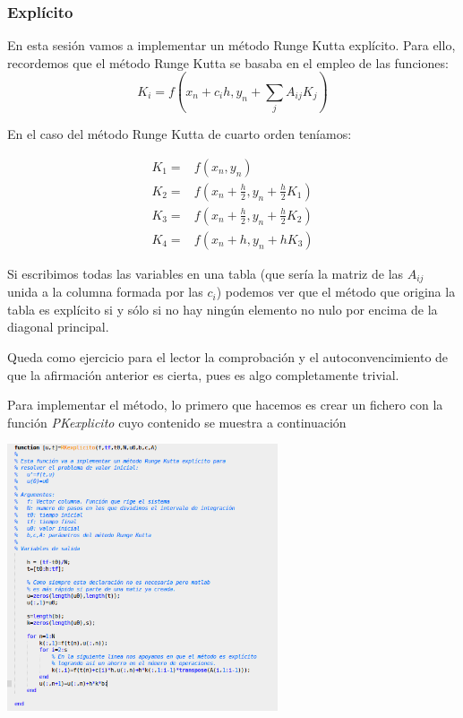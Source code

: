 \subsubsection{Explícito}
En esta sesión vamos a implementar un método Runge Kutta explícito. Para ello, recordemos que el método Runge Kutta se basaba en el empleo de las funciones:
\[K_i = f(x_n+c_ih,y_n+\sum_j A_{ij}K_j)\]

En el caso del método Runge Kutta de cuarto orden teníamos:

\[
\begin{array}{ll}
K_1 = & f(x_n,y_n)\\
K_2 = & f(x_n+\frac{h}{2}, y_n+\frac{h}{2}K_1)\\
K_3 = & f(x_n+\frac{h}{2}, y_n + \frac{h}{2}K_2)\\
K_4 = & f(x_n+h, y_n + h K_3)
\end{array}
\]

Si escribimos todas las variables en una tabla (que sería la matriz de las $A_{ij}$ unida a la columna formada por las $c_i$) podemos ver que el método que origina la tabla es explícito si y sólo si no hay ningún elemento no nulo por encima de la diagonal principal.

\obs Queda como ejercicio para el lector la comprobación y el autoconvencimiento de que la afirmación anterior es cierta, pues es algo completamente trivial.

Para implementar el método, lo primero que hacemos es crear un fichero con la función \textit{PKexplicito} cuyo contenido se muestra a continuación
\begin{center}
\includegraphics[width=0.6\textwidth]{img/RK4_explicito.png}
\end{center}

